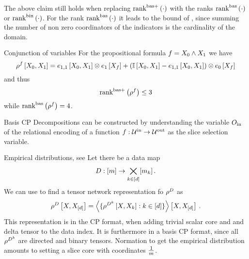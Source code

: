 The above claim still holds when replacing $\mathrm{rank}^{\mathrm{bas+}}\left(\cdot\right)$ with the ranks $\mathrm{rank}^{\mathrm{bas}}\left(\cdot\right)$ or $\mathrm{rank}^{\mathrm{bin}}\left(\cdot\right)$.
For the rank $\mathrm{rank}^{\mathrm{bas}}\left(\cdot\right)$ it leads to the bound of , since summing the number of non zero coordinators of the indicators is the cardinality of the domain.

\begin{example}{Conjunction of variables}
	For the propositional formula $f = X_{0} \land X_{1}$ we have
		\[ \rho^{f}\left[X_{0},X_{1}\right]
		 = e_{1,1}\left[X_{0},X_{1}\right] \otimes e_{1}\left[X_{f}\right]
		  +  (\mathbb{I}\left[X_{0},X_{1}\right] - e_{1,1}\left[X_{0},X_{1}\right]) \otimes e_{0}\left[X_{f}\right]  \]
	and thus 
		\[ \mathrm{rank}^{\mathrm{bas+}}\left(\rho^{f}\right) \leq 3\]
	while $\mathrm{rank}^{\mathrm{bas}}\left(\rho^{f}\right) = 4$.
\end{example}





Basis CP Decompositions can be constructed by understanding the variable $O_{\mathrm{in}}$ of the relational encoding of a function $f:\mathcal{U}^{\mathrm{in}} \rightarrow \mathcal{U}^{\mathrm{out}}$ as the slice selection variable.

\begin{example}{Empirical distributions, see }
	Let there be a data map 
		\[ D : [m] \rightarrow \bigtimes_{k\in[d]}[m_{k}] \, . \]
	We can use  to find a tensor network representation fo $\rho^{D}$ as
	\begin{align*}
		\rho^{D}\left[X,X_{[d]}\right]  
		= \left\langle 
		\{\rho^{D^{k}}\left[X,X_{k}\right] : k\in[d] \} 
		\right\rangle \left[ X,X_{[d]} \right] \, . 
	\end{align*}
	This representation is in the CP format, when adding trivial scalar core and and delta tensor to the data index.
	It is furthermore in a basis CP format, since all $\rho^{D^{k}}$ are directed and binary tensors.
	Normation to get the empirical distribution amounts to setting a slice core with coordinates $\frac{1}{m}$.
\end{example}





